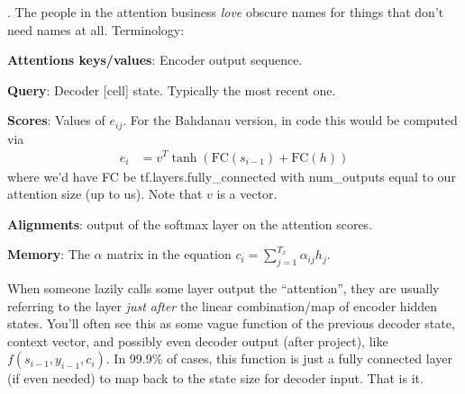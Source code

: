 \documentclass[11pt]{article}
\begin{document}
\myspace
\p {}. The people in the attention business \textit{love} obscure names for things that don't need names at all. Terminology:
\begin{compactitem}
	\item \textbf{Attentions keys/values}: Encoder output sequence.
	\item \textbf{Query}: Decoder [cell] state. Typically the most recent one.
	\item \textbf{Scores}: Values of $e_{ij}$. For the Bahdanau version, in code this would be computed via
	\begin{align}
	e_i &= v^T \tanh(\text{FC}(s_{i - 1}) + \text{FC}(h))
	\end{align}
	where we'd have FC be tf.layers.fully\_connected with num\_outputs equal to our attention size (up to us). Note that $v$ is a vector.
	\item \textbf{Alignments}: output of the softmax layer on the attention scores. 
	\item \textbf{Memory}: The $\alpha$ matrix in the equation $c_i = \sum_{j = 1}^{T_x} \alpha_{ij} h_j$.
\end{compactitem}

\myspace
\p When someone lazily calls some layer output the ``attention'', they are usually referring to the layer \textit{just after} the linear combination/map of encoder hidden states. You'll often see this as some vague function of the previous decoder state, context vector, and possibly even decoder output (after project), like $f(s_{i - 1}, y_{i - 1}, c_i)$. In 99.9\% of cases, this function is just a fully connected layer (if even needed) to map back to the state size for decoder input. That is it.
\end{document}
